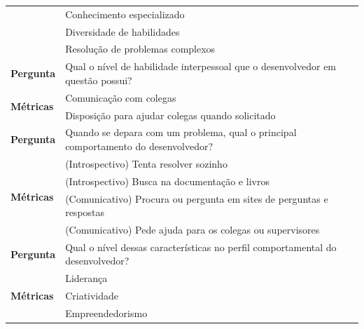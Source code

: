 \begin{table}[h]
\begin{tabular}{|p{2cm}|p{6.25cm}|p{6.25cm}|}
		& \multicolumn{2}{l|}{Conhecimento especializado}                                                         \\ \cline{2-3} 
		& \multicolumn{2}{l|}{Diversidade de habilidades}                                                         \\ \cline{2-3} 
		& \multicolumn{2}{l|}{Resolução de problemas complexos}                                                   \\ \hline\hline
		\textbf{Pergunta}                  & \multicolumn{2}{l|}{\parbox[c][1.2cm][c]{12cm}{Qual o nível de habilidade interpessoal que o desenvolvedor em questão possui?}}     \\ \hline
		\multirow{2}{*}{\textbf{Métricas}} & \multicolumn{2}{l|}{Comunicação com colegas}                                                            \\ \cline{2-3} 
		& \multicolumn{2}{l|}{Disposição para ajudar colegas quando solicitado}                                   \\ \hline\hline
		\textbf{Pergunta}                  & \multicolumn{2}{l|}{\parbox[c][1.2cm][c]{12cm}{Quando se depara com um problema, qual o principal comportamento do desenvolvedor?}} \\ \hline
		\multirow{4}{*}{\textbf{Métricas}} & \multicolumn{2}{l|}{(Introspectivo) Tenta resolver sozinho}                                             \\ \cline{2-3} 
		& \multicolumn{2}{l|}{(Introspectivo) Busca na documentação e livros}                                     \\ \cline{2-3} 
		& \multicolumn{2}{l|}{(Comunicativo) Procura ou pergunta em sites de perguntas e respostas}               \\ \cline{2-3} 
		& \multicolumn{2}{l|}{(Comunicativo) Pede ajuda para os colegas ou supervisores}                          \\ \hline\hline
		\textbf{Pergunta}                  & \multicolumn{2}{l|}{\parbox[c][1.2cm][c]{12cm}{Qual o nível dessas características no perfil comportamental do desenvolvedor?}}     \\ \hline
		\multirow{4}{*}{\textbf{Métricas}} & \multicolumn{2}{l|}{Liderança}                                                                          \\ \cline{2-3} 
		& \multicolumn{2}{l|}{Criatividade}                                                                       \\ \cline{2-3} 
		& \multicolumn{2}{l|}{Empreendedorismo}                                                                   \\ \cline{2-3} 

\end{tabular}
\end{table}
